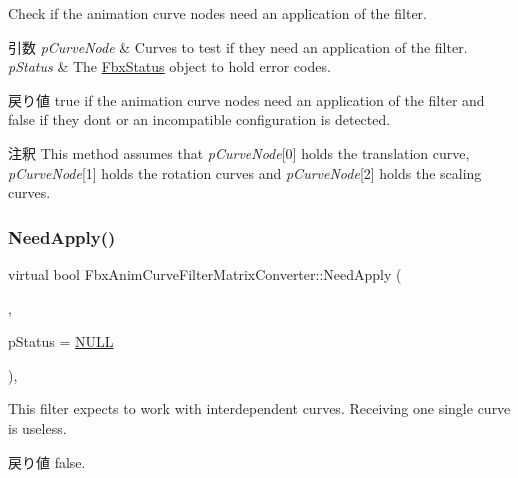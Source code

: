 Check if the animation curve nodes need an application of the filter. 
\begin{DoxyParams}{引数}
{\em p\+Curve\+Node} & Curves to test if they need an application of the filter. \\
\hline
{\em p\+Status} & The \hyperlink{class_fbx_status}{Fbx\+Status} object to hold error codes. \\
\hline
\end{DoxyParams}
\begin{DoxyReturn}{戻り値}
{\ttfamily true} if the animation curve nodes need an application of the filter and {\ttfamily false} if they don\textquotesingle{}t or an incompatible configuration is detected. 
\end{DoxyReturn}
\begin{DoxyRemark}{注釈}
This method assumes that {\itshape p\+Curve\+Node}\mbox{[}0\mbox{]} holds the translation curve, {\itshape p\+Curve\+Node}\mbox{[}1\mbox{]} holds the rotation curves and {\itshape p\+Curve\+Node}\mbox{[}2\mbox{]} holds the scaling curves. 
\end{DoxyRemark}
\mbox{\label{class_fbx_anim_curve_filter_matrix_converter_aa7105a07dbaf0d9598fa930ff2b3141d}} 
\subsubsection{\texorpdfstring{Need\+Apply()}{NeedApply()}\hspace{0.1cm}{\footnotesize\ttfamily [6/6]}}
{\footnotesize\ttfamily virtual bool Fbx\+Anim\+Curve\+Filter\+Matrix\+Converter\+::\+Need\+Apply (\begin{DoxyParamCaption}\item[{\hyperlink{class_fbx_anim_curve}{Fbx\+Anim\+Curve} \&}]{,  }\item[{\hyperlink{class_fbx_status}{Fbx\+Status} $\ast$}]{p\+Status = {\ttfamily \hyperlink{fbxarch_8h_a070d2ce7b6bb7e5c05602aa8c308d0c4}{N\+U\+LL}} }\end{DoxyParamCaption})\hspace{0.3cm}{\ttfamily [inline]}, {\ttfamily [virtual]}}

This filter expects to work with interdependent curves. Receiving one single curve is useless. \begin{DoxyReturn}{戻り値}
{\ttfamily false}. 
\end{DoxyReturn}


